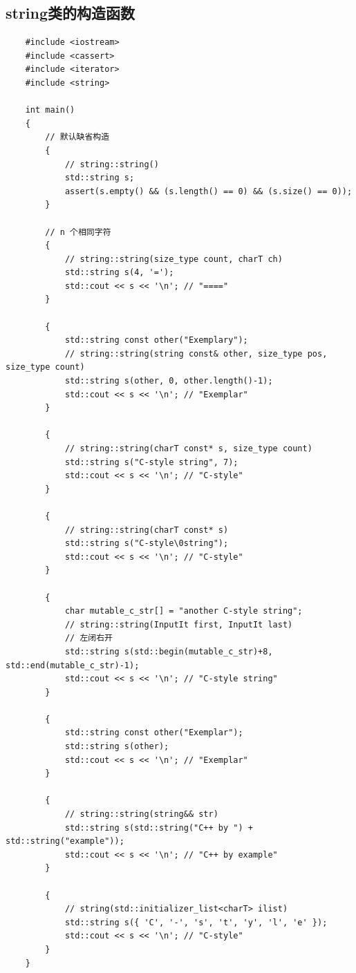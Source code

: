 \documentclass[UTF8,a4paper,12pt]{ctexbook} %
\begin{document}
		\subsection{string类的构造函数}
			\begin{lstlisting}
	#include <iostream>
	#include <cassert>
	#include <iterator>
	#include <string>
	
	int main()
	{
		// 默认缺省构造
		{
			// string::string()
			std::string s;
			assert(s.empty() && (s.length() == 0) && (s.size() == 0));
		}
		
		// n 个相同字符
		{
			// string::string(size_type count, charT ch)
			std::string s(4, '=');
			std::cout << s << '\n'; // "===="
		}
		
		{
			std::string const other("Exemplary");
			// string::string(string const& other, size_type pos, size_type count)
			std::string s(other, 0, other.length()-1);
			std::cout << s << '\n'; // "Exemplar"
		}
		
		{
			// string::string(charT const* s, size_type count)
			std::string s("C-style string", 7);
			std::cout << s << '\n'; // "C-style"
		}
		
		{
			// string::string(charT const* s)
			std::string s("C-style\0string");
			std::cout << s << '\n'; // "C-style"
		}
		
		{
			char mutable_c_str[] = "another C-style string";
			// string::string(InputIt first, InputIt last)
			// 左闭右开
			std::string s(std::begin(mutable_c_str)+8, std::end(mutable_c_str)-1);
			std::cout << s << '\n'; // "C-style string"
		}
		
		{
			std::string const other("Exemplar");
			std::string s(other);
			std::cout << s << '\n'; // "Exemplar"
		}
		
		{
			// string::string(string&& str)
			std::string s(std::string("C++ by ") + std::string("example"));
			std::cout << s << '\n'; // "C++ by example"
		}
		
		{
			// string(std::initializer_list<charT> ilist)
			std::string s({ 'C', '-', 's', 't', 'y', 'l', 'e' });
			std::cout << s << '\n'; // "C-style"
		}
	}			
			\end{lstlisting}
\end{document}

